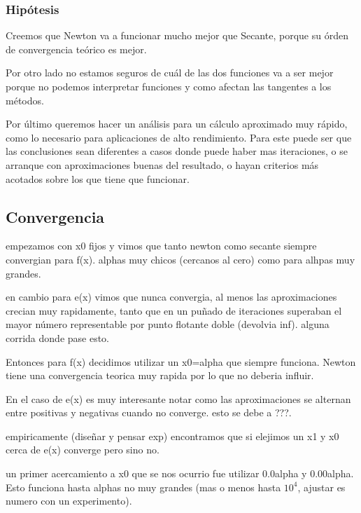 \subsubsection{Hipótesis}
Creemos que Newton va a funcionar mucho mejor que Secante, porque su órden de
convergencia teórico es mejor.

Por otro lado no estamos seguros de cuál de las dos funciones va a ser mejor
porque no podemos interpretar funciones y como afectan las tangentes a los
métodos.

Por último queremos hacer un análisis para un cálculo aproximado muy rápido,
como lo necesario para aplicaciones de alto rendimiento. Para este puede ser que las conclusiones sean
diferentes a casos donde puede haber mas iteraciones, o se arranque con aproximaciones buenas del resultado,
o hayan criterios más acotados sobre los que tiene que funcionar.


\subsection{Convergencia}

empezamos con x0 fijos y vimos que tanto newton como secante siempre convergian
para f(x). %
alphas muy chicos (cercanos al cero) como para alhpas muy grandes.

en cambio para e(x) vimos que nunca convergia, al menos las aproximaciones
crecian muy rapidamente, tanto que en un puñado de iteraciones superaban el
mayor número representable por punto flotante doble (devolvia inf). %
alguna corrida donde pase esto.

Entonces para f(x) decidimos utilizar un x0=alpha que siempre funciona. Newton
tiene una convergencia teorica muy rapida por lo que no deberia influir.

En el caso de e(x) es muy interesante notar como las aproximaciones se alternan
entre positivas y negativas cuando no converge. esto se debe a ???.


empiricamente (diseñar y pensar exp) encontramos que si elejimos un x1 y x0
cerca de e(x) converge pero sino no.

un primer acercamiento a x0 que se nos ocurrio fue utilizar 0.0alpha y
0.00alpha. Esto funciona hasta alphas no muy grandes (mas o menos hasta $10^4$,
ajustar es numero con un experimento).

